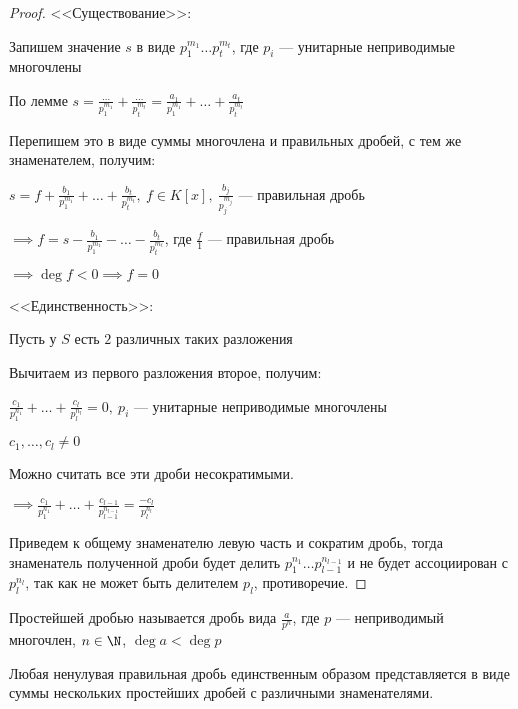 \begin{proof}
    
    <<Существование>>:

    Запишем значение $s$ в виде $p_1^{m_1} \ldots p_t^{m_t}$, где $p_i$ --- унитарные неприводимые многочлены

    По лемме $s = \frac{\ldots}{p_1^{m_1}} + \frac{\ldots}{p_t^{m_t}} = \frac{a_1}{p_1^{m_1}} + \ldots + \frac{a_t}{p_t^{m_t}}$
    
    Перепишем это в виде суммы многочлена и правильных дробей, с тем же знаменателем, получим:

    $s = f + \frac{b_1}{p_1^{m_1}} + \ldots + \frac{b_t}{p_t^{m_t}},~f \in K[x],~\frac{b_j}{p_j^{m_j}}$ --- правильная дробь

    $\implies f = s - \frac{b_1}{p_1^{m_1}} - \ldots - \frac{b_t}{p_t^{m_t}}$, где $\frac{f}{1}$ --- правильная дробь

    $\implies \deg f < 0 \implies f = 0$

    <<Единственность>>:
    
    Пусть у $S$ есть $2$ различных таких разложения

    Вычитаем из первого разложения второе, получим:

    $\frac{c_1}{p_1^{n_1}} + \ldots + \frac{c_l}{p_l^{n_l}} = 0,~p_i$ --- унитарные неприводимые многочлены

    $c_1, \ldots, c_l \neq 0$

    Можно считать все эти дроби несократимыми.

    $\implies \frac{c_1}{p_1^{n_1}} + \ldots + \frac{c_{l-1}}{p_{l-1}^{n_{l-1}}} = \frac{-c_l}{p_l^{n_l}}$

    Приведем к общему знаменателю левую часть и сократим дробь, тогда знаменатель полученной дроби будет делить $p_1^{n_1} \ldots p_{l-1}^{n_{l-1}}$ и не будет ассоциирован с $p_l^{n_l}$, так как не может быть делителем $p_l$, противоречие.
\end{proof}

\begin{defn}
    Простейшей дробью называется дробь вида $\frac{a}{p^n}$, где $p$ --- неприводимый многочлен, $n \in \N$, $\deg a < \deg p$
\end{defn}

\begin{theorem}
    Любая ненулувая правильная дробь единственным образом представляется в виде суммы нескольких простейших дробей с различными знаменателями.
\end{theorem}

